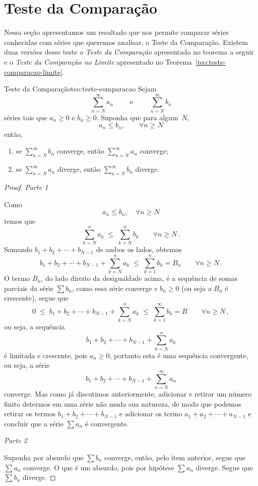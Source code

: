 \section{Teste da Comparação}

Nessa seção apresentamos um resultado que nos permite comparar séries conhecidas
com séries que queremos analisar, o Teste da Comparação. Existem duas versões
desse teste o \emph{Teste da Comparação} apresentado no teorema a seguir
e o \emph{Teste da Comparação no Limite} apresentado no
Teorema~\ref{teo:teste-comparacao-limite}.

\begin{teorema}{Teste da Comparação}{teo:teste-comparacao}
  Sejam%
  \[
    \sum_{n=N}^\infty a_n
    \qquad\text{ e }\qquad
    \sum_{n=N}^\infty b_n
  \]
  séries tais que $a_n\geq 0$ e $b_n\geq 0$. Suponha que para algum~$N$,
  \[
    a_n\leq b_n, \qquad \forall  n\geq N
  \]
  então,
  \begin{enumerate}
    \item se \(\sum_{n=N}^\infty b_n\) converge, \tabto{45mm} então \(\sum_{n=N}^\infty a_n\) converge;
    \item se \(\sum_{n=N}^\infty a_n\) diverge,  \tabto{45mm} então \(\sum_{n=N}^\infty b_n\) diverge.
  \end{enumerate}
\end{teorema}
\begin{proof}
  \emph{Parte 1}

  Como
  \[
    a_n\leq b_n, \quad \forall  n\geq N
  \]
  temos que
  \[
    \sum_{k=N}^n a_k    \;\leq\;
    \sum_{k=N}^n b_k    \qquad \forall n\geq N      \,.
  \]
  Somando $b_1+b_2+\cdots+ b_{N-1}$ de ambos os lados, obtemos
  \[
    b_1 + b_2 + \cdots + b_{N-1} + \sum_{k=N}^na_k
    \;\leq\;
    \sum_{k=1}^nb_k=B_n \qquad \forall n\geq N         \,.
  \]
  O termo $B_n$, do lado direito da desigualdade acima, é a sequência de
  somas parciais da série $\sum b_n$, como essa série converge e
  $b_n\geq 0$ (ou seja a $B_n$ é crescente), segue que
  \[
    0 \;\leq\; b_1 + b_2 + \cdots + b_{N-1} + \sum_{k=N}^na_k
      \;\leq\; \sum_{k=1}^\infty b_k
      = B
      \qquad \forall n\geq N          \,,
  \]
  ou seja, a sequência
  \[
    b_1 + b_2 + \cdots + b_{N-1} + \sum_{k=N}^na_k
  \]
  é limitada e crescente,
  pois $a_n\geq 0$, portanto esta é uma sequência convergente, ou seja, a série
  \[
    b_1+b_2+\cdots+ b_{N-1}+\sum_{n=N}^\infty a_n
  \]
  converge. Mas como já discutimos
  anteriormente, adicionar e retirar um número finito determos em uma série não muda sua
  natureza, de modo que podemos retirar os termos $b_1+b_2+\cdots+ b_{N-1}$ e adicionar os
  termo $a_1+a_2+\cdots+ a_{N-1}$ e concluir que a série $\sum a_n$ é convergente.

\emph{Parte 2}

  Suponha por absurdo que $\sum b_n$ converge, então, pelo item anterior,
  segue que $\sum a_n$ converge. O que é um absurdo, pois por hipótese $\sum a_n$
  diverge. Segue que $\sum b_n$ diverge.
\end{proof}
